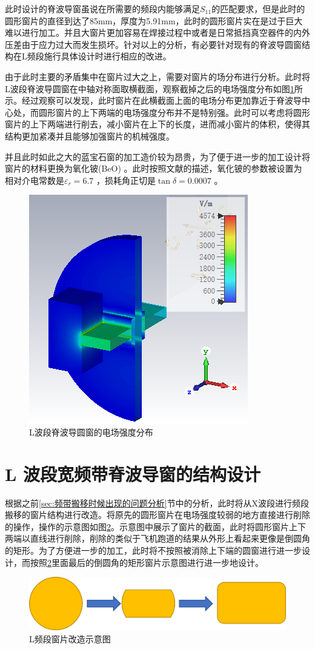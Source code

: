\documentclass[master]{thesis-uestc}
\begin{document}
此时设计的脊波导窗虽说在所需要的频段内能够满足$S_{11}$的匹配要求，但是此时的圆形窗片的直径到达了85mm，厚度为5.91mm，此时的圆形窗片实在是过于巨大难以进行加工。并且大窗片更加容易在焊接过程中或者是日常抵挡真空器件的内外压差由于应力过大而发生损坏。针对以上的分析，有必要针对现有的脊波导圆窗结构在L频段施行具体设计时进行相应的改进。

由于此时主要的矛盾集中在窗片过大之上，需要对窗片的场分布进行分析。此时将L波段脊波导圆窗在中轴对称面取横截面，观察截掉之后的电场强度分布如图\ref{fig:L波段脊波导圆窗的电场强度分布}所示。经过观察可以发现，此时窗片在此横截面上面的电场分布更加靠近于脊波导中心处，而圆形窗片的上下两端的电场强度分布并不是特别强。此时可以考虑将圆形窗片的上下两端进行削去，减小窗片在上下的长度，进而减小窗片的体积，使得其结构更加紧凑并且能够加强窗片的机械强度。

并且此时如此之大的蓝宝石窗的加工造价较为昂贵，为了便于进一步的加工设计将窗片的材料更换为氧化铍(BeO) 。此时按照文献\cite{thumm_2020_State}的描述，氧化铍的参数被设置为相对介电常数是$\varepsilon_r = 6.7$ ，损耗角正切是$\tan \delta = 0.0007$ 。

\begin{figure}[!htb]
    \centering
    \includegraphics[width=0.35\linewidth]{pic/chapter4/L波段脊波导圆窗的电场强度分布.png}
    \caption{L波段脊波导圆窗的电场强度分布}
    \label{fig:L波段脊波导圆窗的电场强度分布}
\end{figure}

\section{L 波段宽频带脊波导窗的结构设计}
根据之前\ref{sec:频带搬移时候出现的问题分析}节中的分析，此时将从X波段进行频段搬移的窗片结构进行改造。将原先的圆形窗片在电场强度较弱的地方直接进行削除的操作，操作的示意图如图\ref{fig:L频段改造}。示意图中展示了窗片的截面，此时将圆形窗片上下两端以直线进行削除，削除的类似于飞机跑道的结果从外形上看起来更像是倒圆角的矩形。为了方便进一步的加工，此时将不按照被消除上下端的圆窗进行进一步设计，而按照\ref{fig:L频段改造}里面最后的倒圆角的矩形窗片示意图进行进一步地设计。
\begin{figure}[!htb]
    \centering
    \includegraphics[width=0.5\linewidth]{pic/chapter4/L脊波导窗片改造.png}
    \caption{L频段窗片改造示意图}
    \label{fig:L频段改造}
\end{figure}
\end{document}
